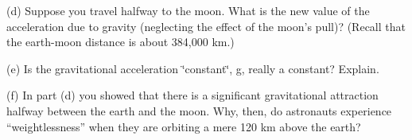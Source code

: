 (d) Suppose you travel halfway to the moon. What is the new value of the acceleration due to gravity (neglecting the effect of the moon's pull)? (Recall that the earth-moon distance is about 384,000 km.)
\vspace{30mm}

(e) Is the gravitational acceleration \char`\"{}constant\char`\"{}, g, really
a constant? Explain.
\vspace{30mm}

(f) In part (d) you showed that there is a significant gravitational attraction
halfway between the earth and the moon. Why, then, do astronauts experience
``weightlessness'' when they are orbiting a mere 120 km above the earth?


